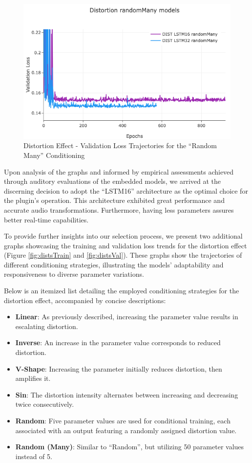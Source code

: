 \documentclass{article}
\newcommand{\quotes}[1]{``#1''}
\begin{document}
\begin{sloppy}
\begin{figure}[t]
  \centering
  \centerline{\includegraphics[width=\columnwidth]{./plots/trimmedImgs/randomMany dist valLoss.png}}
  \caption{Distortion Effect - Validation Loss Trajectories for the \quotes{Random Many} Conditioning}
  \label{fig:randomManyVal}
\end{figure}

Upon analysis of the graphs and informed by empirical assessments achieved through auditory evaluations of the embedded models, we arrived at the discerning decision to adopt the \quotes{LSTM16} architecture as the optimal choice for the plugin's operation. This architecture exhibited great performance and accurate audio transformations. Furthermore, having less parameters assures better real-time capabilities.

To provide further insights into our selection process, we present two additional graphs showcasing the training and validation loss trends for the distortion effect (Figure \ref{fig:distsTrain} and \ref{fig:distsVal}). These graphs show the trajectories of different conditioning strategies, illustrating the models' adaptability and responsiveness to diverse parameter variations. 

Below is an itemized list detailing the employed conditioning strategies for the distortion effect, accompanied by concise descriptions:

\begin{itemize}
  \item \textbf{Linear}: As previously described, increasing the parameter value results in escalating distortion.
  \item \textbf{Inverse}: An increase in the parameter value corresponds to reduced distortion.
  \item \textbf{V-Shape}: Increasing the parameter initially reduces distortion, then amplifies it.
  \item \textbf{Sin}: The distortion intensity alternates between increasing and decreasing twice consecutively.
  \item \textbf{Random}: Five parameter values are used for conditional training, each associated with an output featuring a randomly assigned distortion value.
  \item \textbf{Random (Many)}: Similar to \quotes{Random}, but utilizing 50 parameter values instead of 5.
\end{itemize}


\end{sloppy}
\end{document}
